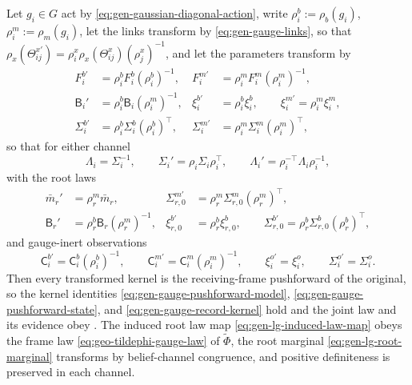 Let \(g_i\in G\) act by \eqref{eq:gen-gaussian-diagonal-action}, write
\(\rho^b_i:=\rho_b(g_i)\), \(\rho^m_i:=\rho_m(g_i)\), let the links transform by
\eqref{eq:gen-gauge-links}, so that
\(\rho_x(\Theta^{x\prime}_{ij})=\rho^x_i\rho_x(\Theta^x_{ij})(\rho^x_j)^{-1}\),
and let the parameters transform by
\begin{align}
F_i^{b\prime}
&=\rho^b_iF_i^b(\rho^b_i)^{-1},
&
F_i^{m\prime}
&=\rho^m_iF_i^m(\rho^m_i)^{-1},
\label{eq:gen-gauge-selfmaps}\\
\mathsf B_i'
&=\rho^b_i\mathsf B_i(\rho^m_i)^{-1},
&
\xi_i^{b\prime}
&=\rho^b_i\xi_i^b,
\qquad
\xi_i^{m\prime}=\rho^m_i\xi_i^m,
\label{eq:gen-gauge-bridge-offsets}\\
\Sigma_i^{b\prime}&=\rho^b_i\Sigma_i^b(\rho^b_i)^\top,
&
\Sigma_i^{m\prime}&=\rho^m_i\Sigma_i^m(\rho^m_i)^\top,
\label{eq:gen-gauge-covariances}
\end{align}
so that for either channel
\begin{equation}
\Lambda_i=\Sigma_i^{-1},
\qquad
\Sigma_i'=\rho_i\Sigma_i\rho_i^\top,
\qquad
\Lambda_i'=\rho_i^{-\top}\Lambda_i\rho_i^{-1},
\label{eq:gen-gauge-precision}
\end{equation}
with the root laws
\begin{align}
\bar m_r'
&=\rho^m_r\bar m_r,
&
\Sigma_{r,0}^{m\prime}
&=\rho^m_r\Sigma_{r,0}^m(\rho^m_r)^\top,
\label{eq:gen-gauge-root-model}\\
\mathsf B_r'
&=\rho^b_r\mathsf B_r(\rho^m_r)^{-1},
&
\xi_{r,0}^{b\prime}
&=\rho^b_r\xi_{r,0}^b,
\qquad
\Sigma_{r,0}^{b\prime}
=\rho^b_r\Sigma_{r,0}^b(\rho^b_r)^\top,
\label{eq:gen-gauge-root-state}
\end{align}
and gauge-inert observations
\begin{equation}
\mathsf C_i^{b\prime}=\mathsf C_i^b(\rho^b_i)^{-1},
\qquad
\mathsf C_i^{m\prime}=\mathsf C_i^m(\rho^m_i)^{-1},
\qquad
\xi_i^{o\prime}=\xi_i^o,
\qquad
\Sigma_i^{o\prime}=\Sigma_i^o.
\label{eq:gen-gauge-observation}
\end{equation}
Then every transformed kernel is the receiving-frame pushforward of the
original, so the kernel identities \eqref{eq:gen-gauge-pushforward-model},
\eqref{eq:gen-gauge-pushforward-state}, and \eqref{eq:gen-gauge-record-kernel}
hold and the joint law and its evidence obey
. The induced root law map
\eqref{eq:gen-lg-induced-law-map} obeys the frame law
\eqref{eq:geo-tildephi-gauge-law} of \(\widetilde\Phi\), the root marginal
\eqref{eq:gen-lg-root-marginal} transforms by belief-channel congruence, and
positive definiteness is preserved in each channel. 

